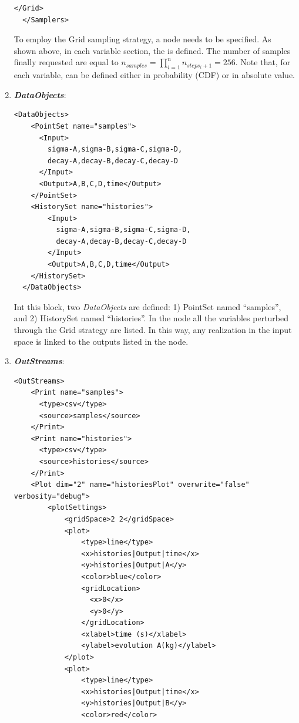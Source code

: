\begin{enumerate}
\begin{lstlisting}[style=XML,morekeywords={arg,extension,pauseAtEnd,overwrite}]
    </Grid>
  </Samplers>  
\end{lstlisting}
  To employ the Grid sampling strategy, a 
   node needs to be specified. As shown above, in each variable section, the   is defined. 
  The number of samples finally requested are equal to $n_{samples} = \prod_{i=1}^{n} n_{steps_{i}+1} = 256$.
  Note that, for each variable, can be defined either in probability (CDF) or in absolute value.  
   \item \textbf{\textit{DataObjects}}:
\begin{lstlisting}[style=XML,morekeywords={arg,extension,pauseAtEnd,overwrite}]
  <DataObjects>
    <PointSet name="samples">
      <Input>
        sigma-A,sigma-B,sigma-C,sigma-D,
        decay-A,decay-B,decay-C,decay-D
      </Input>
      <Output>A,B,C,D,time</Output>
    </PointSet>
    <HistorySet name="histories">
        <Input>
          sigma-A,sigma-B,sigma-C,sigma-D,
          decay-A,decay-B,decay-C,decay-D
        </Input>
        <Output>A,B,C,D,time</Output>
    </HistorySet>
  </DataObjects>
\end{lstlisting}
  Int this block, two \textit{DataObjects} are defined: 1) PointSet named 
  ``samples'', and 2) HistorySet named ``histories''.
  In the  node all the variables 
  perturbed through the Grid strategy are listed. In this way, any
  realization in the input space is linked to the outputs listed in  the 
   node.
   \item \textbf{\textit{OutStreams}}:   
\begin{lstlisting}[style=XML,morekeywords={arg,extension,pauseAtEnd,overwrite}]
  <OutStreams>
    <Print name="samples">
      <type>csv</type>
      <source>samples</source>
    </Print>
    <Print name="histories">
      <type>csv</type>
      <source>histories</source>
    </Print>
    <Plot dim="2" name="historiesPlot" overwrite="false" verbosity="debug">
        <plotSettings>
            <gridSpace>2 2</gridSpace>
            <plot>
                <type>line</type>
                <x>histories|Output|time</x>
                <y>histories|Output|A</y>
                <color>blue</color>
                <gridLocation>
                  <x>0</x>
                  <y>0</y>
                </gridLocation>
                <xlabel>time (s)</xlabel>
                <ylabel>evolution A(kg)</ylabel>
            </plot>
            <plot>
                <type>line</type>
                <x>histories|Output|time</x>
                <y>histories|Output|B</y>
                <color>red</color>

\end{lstlisting}
\end{enumerate}
